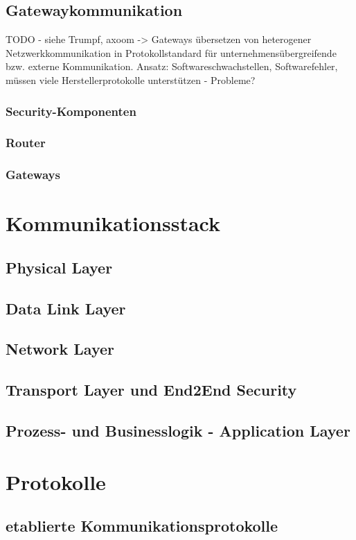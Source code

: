 \subsection{Gatewaykommunikation}
TODO - siehe Trumpf, axoom -> Gateways übersetzen von heterogener Netzwerkkommunikation in Protokollstandard für unternehmensübergreifende bzw. externe Kommunikation.
Ansatz: Softwareschwachstellen, Softwarefehler, müssen viele Herstellerprotokolle unterstützen - Probleme?

\subsubsection{Security-Komponenten}
\subsubsection{Router}
\subsubsection{Gateways}

\section{Kommunikationsstack}
\subsection{Physical Layer}
\subsection{Data Link Layer}
\subsection{Network Layer}
\subsection{Transport Layer und End2End Security}
\subsection{Prozess- und Businesslogik - Application Layer}

\section{Protokolle}
\subsection{etablierte Kommunikationsprotokolle}
